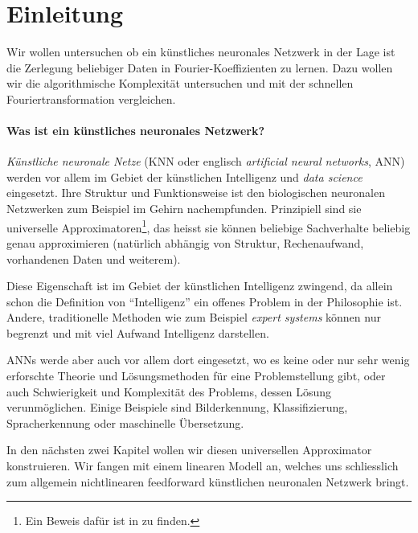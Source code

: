 %
%
%
%
\section{Einleitung\label{ml:section:einleitung}}

Wir wollen untersuchen ob ein künstliches neuronales Netzwerk in der Lage ist die Zerlegung beliebiger
Daten in Fourier-Koeffizienten zu lernen. Dazu wollen wir die algorithmische
Komplexität untersuchen und mit der schnellen Fouriertransformation vergleichen.

\paragraph{Was ist ein künstliches neuronales Netzwerk?} \emph{Künstliche neuronale Netze} (KNN
oder englisch \emph{artificial neural networks}, ANN) werden vor allem im Gebiet der
künstlichen Intelligenz und \emph{data science} eingesetzt. Ihre Struktur und Funktionsweise ist den
biologischen neuronalen Netzwerken zum Beispiel im Gehirn nachempfunden. Prinzipiell sind
sie universelle Approximatoren\footnote{Ein Beweis dafür ist in
\cite{ml:universala-approximator-theorem} zu finden.}, das heisst sie können beliebige
Sachverhalte beliebig genau approximieren (natürlich abhängig von Struktur, Rechenaufwand,
vorhandenen Daten und weiterem).

Diese Eigenschaft ist im Gebiet der künstlichen Intelligenz zwingend,
da allein schon die Definition von ``Intelligenz'' ein offenes Problem in der
Philosophie ist. Andere, traditionelle Methoden wie zum Beispiel \emph{expert systems} können
nur begrenzt und mit viel Aufwand Intelligenz darstellen.

ANNs werde aber auch vor allem dort eingesetzt, wo es keine oder nur sehr wenig erforschte
Theorie und Lösungsmethoden für eine Problemstellung gibt, oder auch Schwierigkeit und
Komplexität des Problems, dessen Lösung verunmöglichen. Einige Beispiele sind
Bilderkennung, Klassifizierung, Spracherkennung oder maschinelle Übersetzung.

\medskip
In den nächsten zwei Kapitel wollen wir diesen universellen Approximator konstruieren.
Wir fangen mit einem linearen Modell an, welches uns schliesslich zum allgemein
nichtlinearen feedforward künstlichen neuronalen Netzwerk bringt.
